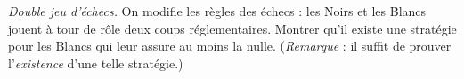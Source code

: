\emph{Double jeu d'échecs.} On modifie les règles des échecs : les Noirs et les Blancs jouent à tour de rôle deux coups réglementaires. Montrer qu'il existe une stratégie pour les Blancs qui leur assure au moins la nulle. (\emph{Remarque} : il suffit de prouver l'\emph{existence} d'une telle stratégie.)
